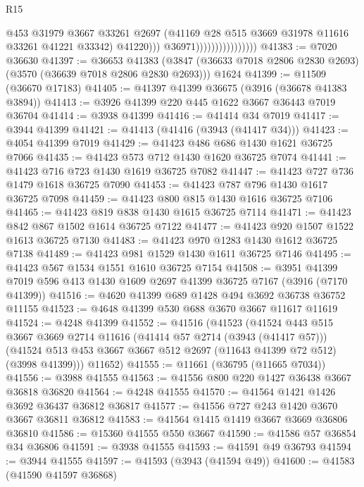 \begin{lexlean}{R15}
\begin{coremodule}
                                          @453
                                          @31979
                                          @3667
                                          @33261
                                          @2697
                                          (@41169 @28 @515 @3669 @31978 @11616 @33261 @41221 @33342)
                                          @41220)))
                                    @36971))))))))))))))))
@41383 := @7020 @36630
@41397 := @36653
    @41383
    (@3847 (@36633 @7018 @2806 @2830 @2693) (@3570 (@36639 @7018 @2806 @2830 @2693)))
    @1624
@41399 := @11509 (@36670 @17183)
@41405 := @41397 @41399 @36675 (@3916 (@36678 @41383 @3894))
@41413 := @3926 @41399 @220 @445 @1622 @3667 @36443 @7019 @36704
@41414 := @3938 @41399
@41416 := @41414 @34 @7019
@41417 := @3944 @41399
@41421 := @41413 (@41416 (@3943 (@41417 @34)))
@41423 := @4054 @41399 @7019
@41429 := @41423 @486 @686 @1430 @1621 @36725 @7066
@41435 := @41423 @573 @712 @1430 @1620 @36725 @7074
@41441 := @41423 @716 @723 @1430 @1619 @36725 @7082
@41447 := @41423 @727 @736 @1479 @1618 @36725 @7090
@41453 := @41423 @787 @796 @1430 @1617 @36725 @7098
@41459 := @41423 @800 @815 @1430 @1616 @36725 @7106
@41465 := @41423 @819 @838 @1430 @1615 @36725 @7114
@41471 := @41423 @842 @867 @1502 @1614 @36725 @7122
@41477 := @41423 @920 @1507 @1522 @1613 @36725 @7130
@41483 := @41423 @970 @1283 @1430 @1612 @36725 @7138
@41489 := @41423 @981 @1529 @1430 @1611 @36725 @7146
@41495 := @41423 @567 @1534 @1551 @1610 @36725 @7154
@41508 := @3951 @41399 @7019 @596 @413 @1430 @1609 @2697 @41399 @36725 @7167 (@3916 (@7170 @41399))
@41516 := @4620 @41399 @689 @1428 @494 @3692 @36738 @36752 @11155
@41523 := @4648 @41399 @530 @688 @3670 @3667 @11617 @11619
@41524 := @4248 @41399
@41552 := @41516
    (@41523
      (@41524
        @443
        @515
        @3667
        @3669
        @2714
        @11616
        (@41414 @57 @2714 (@3943 (@41417 @57)))
        (@41524 @513 @453 @3667 @3667 @512 @2697 (@11643 @41399 @72 @512) (@3998 @41399)))
      @11652)
@41555 := @11661 (@36795 (@11665 @7034))
@41556 := @3988 @41555
@41563 := @41556 @800 @220 @1427 @36438 @3667 @36818 @36820
@41564 := @4248 @41555
@41570 := @41564 @1421 @1426 @3692 @36437 @36812 @36817
@41577 := @41556 @727 @243 @1420 @3670 @3667 @36811 @36812
@41583 := @41564 @1415 @1419 @3667 @3669 @36806 @36810
@41586 := @15360 @41555 @550 @3667
@41590 := @41586 @57 @36854 @34 @36806
@41591 := @3938 @41555
@41593 := @41591 @49 @36793
@41594 := @3944 @41555
@41597 := @41593 (@3943 (@41594 @49))
@41600 := @41583 (@41590 @41597 @36868)

\end{coremodule}
\end{lexlean}
